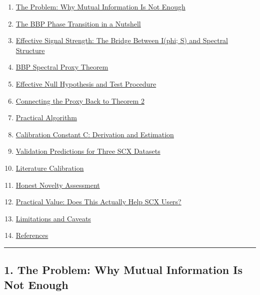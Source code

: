 \documentclass[
  12pt,
]{article}
\providecommand{\tightlist}{%
  \setlength{\itemsep}{0pt}\setlength{\parskip}{0pt}}
\begin{document}
\begin{enumerate}
\def\labelenumi{\arabic{enumi}.}
\tightlist
\item
  \hyperref[1-the-problem-why-mutual-information-is-not-enough]{The
  Problem: Why Mutual Information Is Not Enough}
\item
  \hyperref[2-the-bbp-phase-transition-in-a-nutshell]{The BBP Phase
  Transition in a Nutshell}
\item
  \hyperref[3-effective-signal-strength-the-bridge-between-iphi-s-and-spectral-structure]{Effective
  Signal Strength: The Bridge Between I(phi; S) and Spectral Structure}
\item
  \hyperref[4-bbp-spectral-proxy-theorem]{BBP Spectral Proxy Theorem}
\item
  \hyperref[5-effective-null-hypothesis-and-test-procedure]{Effective
  Null Hypothesis and Test Procedure}
\item
  \hyperref[6-connecting-the-proxy-back-to-theorem-2]{Connecting the
  Proxy Back to Theorem 2}
\item
  \hyperref[7-practical-algorithm]{Practical Algorithm}
\item
  \hyperref[8-calibration-constant-c-derivation-and-estimation]{Calibration
  Constant C: Derivation and Estimation}
\item
  \hyperref[9-validation-predictions-for-three-scx-datasets]{Validation
  Predictions for Three SCX Datasets}
\item
  \hyperref[10-literature-calibration]{Literature Calibration}
\item
  \hyperref[11-honest-novelty-assessment]{Honest Novelty Assessment}
\item
  \hyperref[12-practical-value-does-this-actually-help-scx-users]{Practical
  Value: Does This Actually Help SCX Users?}
\item
  \hyperref[13-limitations-and-caveats]{Limitations and Caveats}
\item
  \hyperref[14-references]{References}
\end{enumerate}

\begin{center}\rule{0.5\linewidth}{0.5pt}\end{center}

\subsection{1. The Problem: Why Mutual Information Is Not
Enough}\label{the-problem-why-mutual-information-is-not-enough}
\end{document}
